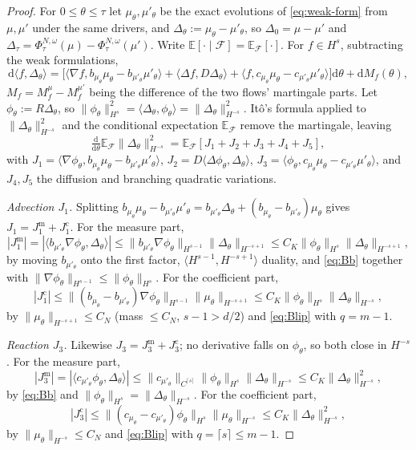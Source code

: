 \documentclass[a4paper,fleqn]{cas-sc}
\theoremstyle{definition}
\theoremstyle{remark}
\begin{document}
\begin{proof}
For $0\le\theta\le\tau$ let $\mu_\theta,\mu'_\theta$ be the exact evolutions of
\eqref{eq:weak-form} from $\mu,\mu'$ under the same drivers, and
$\Delta_\theta:=\mu_\theta-\mu'_\theta$, so $\Delta_0=\mu-\mu'$ and
$\Delta_\tau=\Phi^{N,\omega}_\tau(\mu)-\Phi^{N,\omega}_\tau(\mu')$. Write
$\mathbb E[\cdot\mid\mathcal F]=\mathbb E_{\mathcal F}[\cdot]$. For $f\in H^s$,
subtracting the weak formulations,
\[
\mathrm d\langle f,\Delta_\theta\rangle
=\bigl[\langle\nabla f,b_{\mu_\theta}\mu_\theta-b_{\mu'_\theta}\mu'_\theta\rangle
+\langle\Delta f,D\Delta_\theta\rangle
+\langle f,c_{\mu_\theta}\mu_\theta-c_{\mu'_\theta}\mu'_\theta\rangle\bigr]\mathrm d\theta
+\mathrm dM_f(\theta),
\]
$M_f=M^\mu_f-M^{\mu'}_f$ being the difference of the two flows' martingale parts. Let
$\phi_\theta:=R\Delta_\theta$, so $\|\phi_\theta\|_{H^s}^2
=\langle\Delta_\theta,\phi_\theta\rangle=\|\Delta_\theta\|_{H^{-s}}^2$. It\^o's
formula applied to $\|\Delta_\theta\|_{H^{-s}}^2$ and the conditional expectation
$\mathbb E_{\mathcal F}$ remove the martingale, leaving
\[
\tfrac{\mathrm d}{\mathrm d\theta}\mathbb E_{\mathcal F}\|\Delta_\theta\|_{H^{-s}}^2
=\mathbb E_{\mathcal F}[J_1+J_2+J_3+J_4+J_5],
\]
with $J_1=\langle\nabla\phi_\theta,b_{\mu_\theta}\mu_\theta-b_{\mu'_\theta}\mu'_\theta\rangle$,
$J_2=D\langle\Delta\phi_\theta,\Delta_\theta\rangle$,
$J_3=\langle\phi_\theta,c_{\mu_\theta}\mu_\theta-c_{\mu'_\theta}\mu'_\theta\rangle$,
and $J_4,J_5$ the diffusion and branching quadratic variations.

\emph{Advection $J_1$.} Splitting
$b_{\mu_\theta}\mu_\theta-b_{\mu'_\theta}\mu'_\theta
=b_{\mu'_\theta}\Delta_\theta+(b_{\mu_\theta}-b_{\mu'_\theta})\mu_\theta$ gives
$J_1=J_1^{\mathrm m}+J_1^{\mathrm c}$. For the measure part,
\[
|J_1^{\mathrm m}|
=|\langle b_{\mu'_\theta}\nabla\phi_\theta,\Delta_\theta\rangle|
\le\|b_{\mu'_\theta}\nabla\phi_\theta\|_{H^{s-1}}\|\Delta_\theta\|_{H^{-s+1}}
\le C_K\|\phi_\theta\|_{H^s}\|\Delta_\theta\|_{H^{-s+1}},
\]
by moving $b_{\mu'_\theta}$ onto the first factor, $\langle H^{s-1},H^{-s+1}\rangle$
duality, and \eqref{eq:Bb} together with
$\|\nabla\phi_\theta\|_{H^{s-1}}\le\|\phi_\theta\|_{H^s}$. For the coefficient part,
\[
|J_1^{\mathrm c}|
\le\|(b_{\mu_\theta}-b_{\mu'_\theta})\nabla\phi_\theta\|_{H^{s-1}}\|\mu_\theta\|_{H^{-s+1}}
\le C_K\|\phi_\theta\|_{H^s}\|\Delta_\theta\|_{H^{-s}},
\]
by $\|\mu_\theta\|_{H^{-s+1}}\le C_N$ (mass $\le C_N$, $s-1>d/2$) and
\eqref{eq:Blip} with $q=m-1$.

\emph{Reaction $J_3$.} Likewise $J_3=J_3^{\mathrm m}+J_3^{\mathrm c}$; no
derivative falls on $\phi_\theta$, so both close in $H^{-s}$. For the measure part,
\[
|J_3^{\mathrm m}|
=|\langle c_{\mu'_\theta}\phi_\theta,\Delta_\theta\rangle|
\le\|c_{\mu'_\theta}\|_{C^{\lceil s\rceil}}\|\phi_\theta\|_{H^s}\|\Delta_\theta\|_{H^{-s}}
\le C_K\|\Delta_\theta\|_{H^{-s}}^2,
\]
by \eqref{eq:Bb} and $\|\phi_\theta\|_{H^s}=\|\Delta_\theta\|_{H^{-s}}$. For the
coefficient part,
\[
|J_3^{\mathrm c}|
\le\|(c_{\mu_\theta}-c_{\mu'_\theta})\phi_\theta\|_{H^s}\|\mu_\theta\|_{H^{-s}}
\le C_K\|\Delta_\theta\|_{H^{-s}}^2,
\]
by $\|\mu_\theta\|_{H^{-s}}\le C_N$ and \eqref{eq:Blip} with
$q=\lceil s\rceil\le m-1$.


\end{proof}
\end{document}
